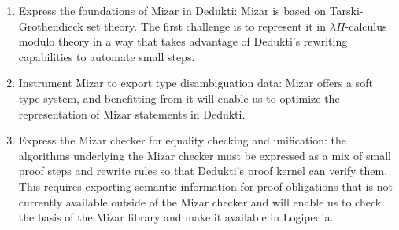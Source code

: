 
\begin{enumerate}
\item Express the foundations of Mizar in Dedukti: Mizar is based on
  Tarski-Grothendieck set theory. The first challenge is to represent it in
  $\lambda\Pi$-calculus modulo theory in a way that takes advantage of Dedukti's
  rewriting capabilities to automate small steps.
\item Instrument Mizar to export type disambiguation data: Mizar offers a soft
  type system, and benefitting from it will enable us to optimize the
  representation of Mizar statements in Dedukti.
\item Express the Mizar checker for equality checking and unification: the
  algorithms underlying the Mizar checker must be expressed as a mix of small
  proof steps and rewrite rules so that Dedukti's proof kernel can verify them.
  This requires exporting semantic information for proof obligations that is not
  currently available outside of the Mizar checker and will enable us to check
  the basis of the Mizar library and make it available in Logipedia.
\end{enumerate}




